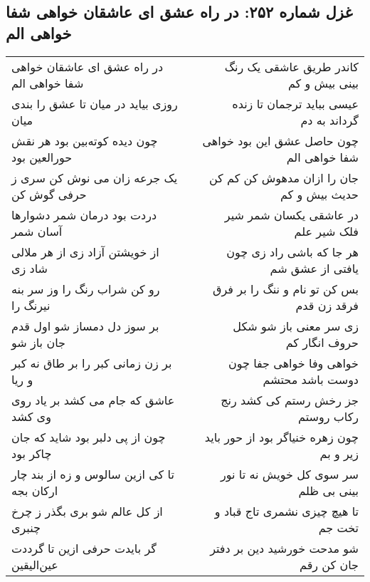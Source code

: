 \begin{center}
\section*{غزل شماره ۲۵۲: در راه عشق ای عاشقان خواهی شفا خواهی الم}
\label{sec:252}
\begin{longtable}{l p{0.5cm} r}
در راه عشق ای عاشقان خواهی شفا خواهی الم
&&
کاندر طریق عاشقی یک رنگ بینی بیش و کم
\\
روزی بیاید در میان تا عشق را بندی میان
&&
عیسی بباید ترجمان تا زنده گرداند به دم
\\
چون دیده کوته‌بین بود هر نقش حورالعین بود
&&
چون حاصل عشق این بود خواهی شفا خواهی الم
\\
یک جرعه زان می نوش کن سری ز حرفی گوش کن
&&
جان را ازان مدهوش کن کم کن حدیث بیش و کم
\\
دردت بود درمان شمر دشوارها آسان شمر
&&
در عاشقی یکسان شمر شیر فلک شیر علم
\\
از خویشتن آزاد زی از هر ملالی شاد زی
&&
هر جا که باشی راد زی چون یافتی از عشق شم
\\
رو کن شراب رنگ را وز سر بنه نیرنگ را
&&
بس کن تو نام و ننگ را بر فرق فرقد زن قدم
\\
بر سوز دل دمساز شو اول قدم جان باز شو
&&
زی سر معنی باز شو شکل حروف انگار کم
\\
بر زن زمانی کبر را بر طاق نه کبر و ریا
&&
خواهی وفا خواهی جفا چون دوست باشد محتشم
\\
عاشق که جام می کشد بر یاد روی وی کشد
&&
جز رخش رستم کی کشد رنج رکاب روستم
\\
چون از پی دلبر بود شاید که جان چاکر بود
&&
چون زهره خنیاگر بود از حور باید زیر و بم
\\
تا کی ازین سالوس و زه از بند چار ارکان بجه
&&
سر سوی کل خویش نه تا نور بینی بی ظلم
\\
از کل عالم شو بری بگذر ز چرخ چنبری
&&
تا هیچ چیزی نشمری تاج قباد و تخت جم
\\
گر بایدت حرفی ازین تا گرددت عین‌الیقین
&&
شو مدحت خورشید دین بر دفتر جان کن رقم
\\
\end{longtable}
\end{center}

